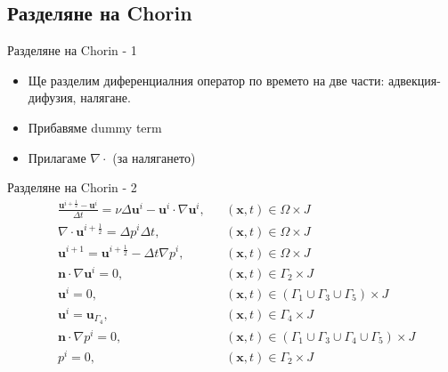 \documentclass{beamer}
\newcommand{\divg}[1]{\nabla\cdot#1}
\newcommand{\grad}[1]{\nabla#1}
\newcommand{\lapl}[1]{\Delta#1}
\newcommand{\vecf}[1]{\boldsymbol{#1}}
\begin{document}
    \subsection{Разделяне на Chorin}
    \begin{frame}{Разделяне на Chorin - 1}
    		\begin{itemize}[<+->]
    			\item Ще разделим диференциалния оператор по времето на две части: адвекция-дифузия, налягане.
    			\item Прибавяме dummy term
    			\item Прилагаме $\nabla\cdot$ (за налягането)
    		\end{itemize}
    \end{frame}
    \begin{frame}{Разделяне на Chorin - 2}
    	\begin{align*}
	&\frac{\vecf{u}^{i + \frac{1}{2}} - \vecf{u}^{i}}{\Delta t} = \nu \Delta \vecf{u}^i - \vecf{u}^i \cdot \nabla\vecf{u}^i, && \left(\mathbf{x}, t\right) \in \Omega \times J \\
	&\divg{\vecf{u}^{i + \frac{1}{2}}} = \lapl{p^i} \Delta t, && \left(\mathbf{x}, t\right) \in \Omega \times J \\
	&\vecf{u}^{i+1} = \vecf{u}^{i+\frac{1}{2}} - \Delta t \grad{p^{i}}, && \left(\mathbf{x}, t\right) \in \Omega \times J  \\
  &\vecf{n} \cdot \grad{\vecf{u}^i} = 0, && \left(\mathbf{x}, t\right) \in \Gamma_2 \times J \\
  &\vecf{u}^i = 0, &&\left(\mathbf{x}, t\right) \in \left(\Gamma_1 \cup \Gamma_3 \cup \Gamma_5\right) \times J \\
  &\vecf{u}^i = \vecf{u}_{\Gamma_4}, && \left(\mathbf{x}, t\right) \in \Gamma_4 \times J \\
  &\vecf{n} \cdot \grad{p^i} = 0, && \left(\mathbf{x}, t\right) \in (\Gamma_1 \cup \Gamma_3 \cup \Gamma_4 \cup \Gamma_5) \times J \\
  &p^i = 0, && \left(\mathbf{x}, t\right) \in \Gamma_2 \times J
\end{align*}
    \end{frame}
    
\fi    
    
\end{document}
